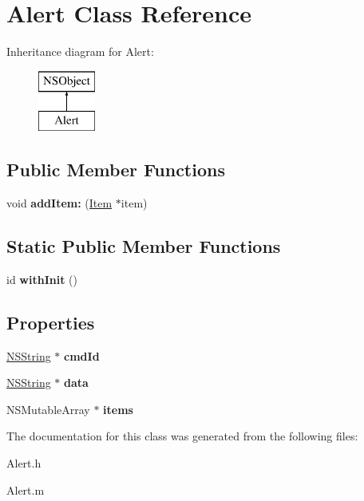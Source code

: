 \hypertarget{interface_alert}{
\section{\-Alert \-Class \-Reference}
\label{interface_alert}
}
\-Inheritance diagram for \-Alert\-:\begin{figure}[H]
\begin{center}
\leavevmode
\includegraphics[height=2.000000cm]{interface_alert}
\end{center}
\end{figure}
\subsection*{\-Public \-Member \-Functions}
\begin{DoxyCompactItemize}
\item 
\hypertarget{interface_alert_a1e4592df5e8f12a9ddb5ba9dc8733202}{
void {\bfseries add\-Item\-:} (\hyperlink{interface_item}{\-Item} $\ast$item)}
\label{interface_alert_a1e4592df5e8f12a9ddb5ba9dc8733202}

\end{DoxyCompactItemize}
\subsection*{\-Static \-Public \-Member \-Functions}
\begin{DoxyCompactItemize}
\item 
\hypertarget{interface_alert_a32adbb6a2f8a562ea105c8b9eccd6afd}{
id {\bfseries with\-Init} ()}
\label{interface_alert_a32adbb6a2f8a562ea105c8b9eccd6afd}

\end{DoxyCompactItemize}
\subsection*{\-Properties}
\begin{DoxyCompactItemize}
\item 
\hypertarget{interface_alert_af1a14c340c81492b37dcb9df0c5ae328}{
\hyperlink{class_n_s_string}{\-N\-S\-String} $\ast$ {\bfseries cmd\-Id}}
\label{interface_alert_af1a14c340c81492b37dcb9df0c5ae328}

\item 
\hypertarget{interface_alert_a5dfd8afa627ed7494584f18d96b88d3a}{
\hyperlink{class_n_s_string}{\-N\-S\-String} $\ast$ {\bfseries data}}
\label{interface_alert_a5dfd8afa627ed7494584f18d96b88d3a}

\item 
\hypertarget{interface_alert_a307ae58151e1590ab60f5b61fb49b0f7}{
\-N\-S\-Mutable\-Array $\ast$ {\bfseries items}}
\label{interface_alert_a307ae58151e1590ab60f5b61fb49b0f7}

\end{DoxyCompactItemize}


\-The documentation for this class was generated from the following files\-:\begin{DoxyCompactItemize}
\item 
\-Alert.\-h\item 
\-Alert.\-m\end{DoxyCompactItemize}
